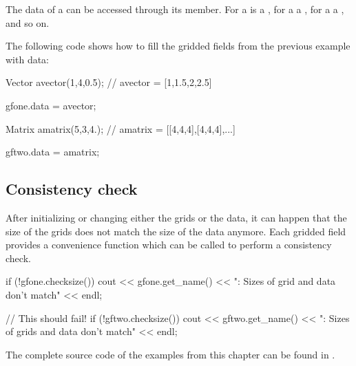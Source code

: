 The data of a  can be accessed through its  member.
For a   is a , for a  a , for a  a , and so on.

The following code shows how to fill the gridded fields from the previous example with data:

\begin{code}
Vector avector(1,4,0.5);    // avector = [1,1.5,2,2.5]

gfone.data = avector;

Matrix amatrix(5,3,4.);     // amatrix = [[4,4,4],[4,4,4],...]

gftwo.data = amatrix;
\end{code}

\subsection{Consistency check}
\label{sec:griddedfields:consistency}

After initializing or changing either the grids or the data, it can happen
that the size of the grids does not match the size of the data anymore. Each
gridded field provides a convenience function which can be called to perform a
consistency check.

\begin{code}
if (!gfone.checksize())
  cout << gfone.get_name()
       << ": Sizes of grid and data don't match" << endl;

// This should fail!
if (!gftwo.checksize())
  cout << gftwo.get_name()
       << ": Sizes of grids and data don't match" << endl;
\end{code}

The complete source code of the examples from this chapter can be found in
.


